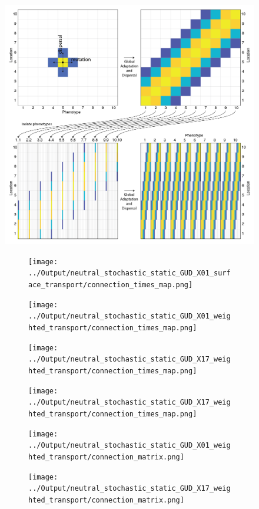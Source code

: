 \documentclass[12pt]{article}
\begin{document}
\begin{figure}[htp!]
\centering
\includegraphics[width=0.8\linewidth]{../Figures/Schematic.png}
\caption{}
\label{Schematic}
\end{figure}


\begin{figure}[htp!]
\begin{subfigure}{0.5\textwidth}
\texttt{[image: ../Output/neutral\_stochastic\_static\_GUD\_X01\_surface\_transport/connection\_times\_map.png]}
\end{subfigure}
\begin{subfigure}{0.5\textwidth}
\texttt{[image: ../Output/neutral\_stochastic\_static\_GUD\_X01\_weighted\_transport/connection\_times\_map.png]}
\end{subfigure}
\begin{subfigure}{0.5\textwidth}
\texttt{[image: ../Output/neutral\_stochastic\_static\_GUD\_X17\_weighted\_transport/connection\_times\_map.png]}
\end{subfigure}
\begin{subfigure}{0.5\textwidth}
\texttt{[image: ../Output/neutral\_stochastic\_static\_GUD\_X17\_weighted\_transport/connection\_times\_map.png]}
\end{subfigure}
\caption{}
\label{Schematic}
\end{figure}


\begin{figure}[htp!]
\begin{subfigure}{0.5\textwidth}
\texttt{[image: ../Output/neutral\_stochastic\_static\_GUD\_X01\_weighted\_transport/connection\_matrix.png]}
\end{subfigure}
\begin{subfigure}{0.5\textwidth}
\texttt{[image: ../Output/neutral\_stochastic\_static\_GUD\_X17\_weighted\_transport/connection\_matrix.png]}
\end{subfigure}
\caption{}
\label{Schematic}
\end{figure}
\end{document}
